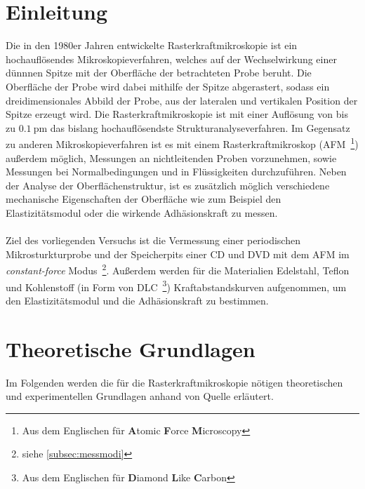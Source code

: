 \setcounter{page}{1}
\section*{Einleitung}
Die in den 1980er Jahren entwickelte Rasterkraftmikroskopie ist ein hochauflösendes Mikroskopieverfahren, welches auf der Wechselwirkung einer dünnnen Spitze mit der Oberfläche der betrachteten Probe beruht. Die Oberfläche der Probe wird dabei mithilfe der Spitze abgerastert, sodass ein dreidimensionales Abbild der Probe, aus der lateralen und vertikalen Position der Spitze erzeugt wird. Die Rasterkraftmikroskopie ist mit einer Auflösung von bis zu $\SI{0,1}{\pico\meter}$ das bislang hochauflösendste Strukturanalyseverfahren. Im Gegensatz zu anderen Mikroskopieverfahren ist es mit einem Rasterkraftmikroskop (AFM~\footnote{Aus dem Englischen für \textbf{A}tomic \textbf{F}orce \textbf{M}icroscopy}) außerdem möglich, Messungen an nichtleitenden Proben vorzunehmen, sowie Messungen bei Normalbedingungen und in Flüssigkeiten durchzuführen. Neben der Analyse der Oberflächenstruktur, ist es zusätzlich möglich verschiedene mechanische Eigenschaften der Oberfläche wie zum Beispiel den Elastizitätsmodul oder die wirkende Adhäsionskraft zu messen. \\
\\
Ziel des vorliegenden Versuchs ist die Vermessung einer periodischen Mikrosturkturprobe und der Speicherpits einer CD und DVD mit dem AFM im \textit{constant-force} Modus~\footnote{siehe \autoref{subsec:messmodi}}. Außerdem werden für die Materialien Edelstahl, Teflon und Kohlenstoff (in Form von DLC~\footnote{Aus dem Englischen für \textbf{D}iamond \textbf{L}ike \textbf{C}arbon}) Kraftabstandskurven aufgenommen, um den Elastizitätsmodul und die Adhäsionskraft zu bestimmen.
\newpage
\section{Theoretische Grundlagen}
Im Folgenden werden die für die Rasterkraftmikroskopie nötigen theoretischen und experimentellen Grundlagen anhand von Quelle \cite{Voigt} erläutert.
